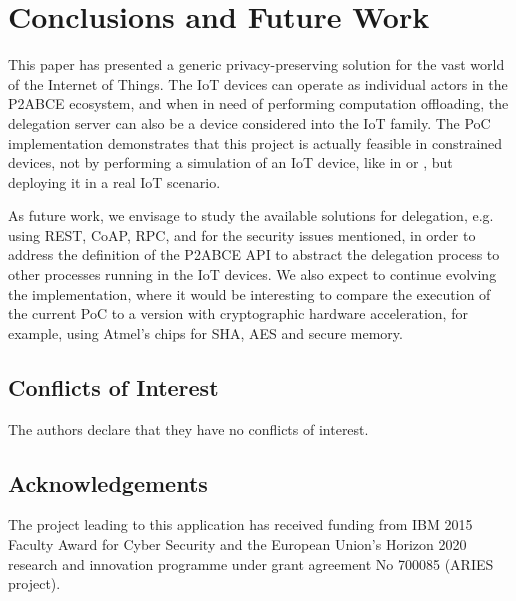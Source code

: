 \section{Conclusions and Future Work}\label{ch:conclusions}

This paper has presented a generic privacy-preserving solution for the vast world of the Internet of Things. The IoT devices can operate as individual actors in the P2ABCE ecosystem, and when in need of performing computation offloading, the delegation server can also be a device considered into the IoT family.
The PoC implementation demonstrates that this project is actually feasible in constrained devices, not by performing a simulation of an IoT device, like in \cite{vanet} or \cite{alcaide2013anonymous}, but deploying it in a real IoT scenario.

As future work, we envisage to study the available solutions for delegation, e.g. using REST, CoAP, RPC, and for the security issues mentioned, in order to address the definition of the P2ABCE API to abstract the delegation process to other processes running in the IoT devices. 
We also expect to continue evolving the implementation, where it would be interesting to compare the execution of the current PoC to a version with cryptographic hardware acceleration, for example, using Atmel's chips for SHA, AES and secure memory.



\subsection*{Conflicts of Interest}

The authors declare that they have no conflicts of interest.

\subsection*{Acknowledgements}

The project leading to this application has received funding from IBM 2015 Faculty Award for Cyber Security and the European Union’s Horizon 2020 research and innovation programme under grant agreement No 700085 (ARIES project).
